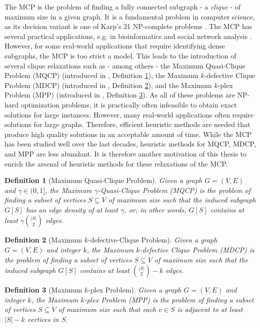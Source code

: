 \documentclass[11pt]{article}
\newtheorem{definition}{Definition}[section]
\begin{document}
The MCP is the problem of finding a fully connected subgraph - a \textit{clique} - of maximum size in a given graph. It is a fundamental problem in computer science, as its decision variant is one of Karp's 21 NP-complete problems \cite{Karp1972}. The MCP has several practical applications, e.g. in bioinformatics \cite{Dognin2010} and social network analysis \cite{Pattillo_network_analysis_2013}. However, for some real-world applications that require identifying dense subgraphs, the MCP is too strict a model. This leads to the introduction of several clique relaxations such as - among others - the Maximum Quasi-Clique Problem (MQCP) (introduced in \cite{Abello2002}, Definition \ref{def:mqcp}), the Maximum $k$-defective Clique Problem (MDCP) (introduced in \cite{Yu2006}, Definition \ref{def:mdcp}), and the Maximum $k$-plex Problem (MPP) (introduced in \cite{Seidman1978}, Definition \ref{def:mpp}). 
As all of these problems are NP-hard optimization problems, it is practically often infeasible to obtain exact solutions for large instances. However, many real-world applications often require solutions for large graphs. Therefore, efficient heuristic methods are needed that produce high quality solutions in an acceptable amount of time. While the MCP has been studied well over the last decades, heuristic methods for MQCP, MDCP, and MPP are less abundant. It is therefore another motivation of this thesis to enrich the arsenal of heuristic methods for these relaxations of the MCP. 

\begin{definition}[Maximum Quasi-Clique Problem]
	\label{def:mqcp}
	Given a graph $G = (V,E)$ and $\gamma \in (0,1]$, the Maximum $\gamma$-Quasi-Clique Problem (MQCP) is the problem of finding a subset of vertices $S \subseteq V$ of maximum size 
	such that the induced subgraph $G[S]$ has an edge density of at least $\gamma$, or, in other words, $G[S]$ contains at least $\gamma \binom{|S|}{2}$ edges. 
\end{definition}

\begin{definition}[Maximum $k$-defective-Clique Problem]
	\label{def:mdcp}
	Given a graph $G = (V,E)$ and integer $k$, the Maximum $k$-defective Clique Problem (MDCP) is the problem of finding a subset of vertices $S \subseteq V$ of maximum size 
	such that the induced subgraph $G[S]$ contains at least $\binom{|S|}{2} - k$ edges. 
\end{definition}

\begin{definition}[Maximum $k$-plex Problem]
	\label{def:mpp}
	Given a graph $G = (V,E)$ and integer $k$, the Maximum $k$-plex Problem (MPP) is the problem of finding a subset of vertices $S \subseteq V$ of maximum size 
	such that each $v \in S$ is adjacent to at least $|S| - k$ vertices in $S$. 
\end{definition}
\end{document}
